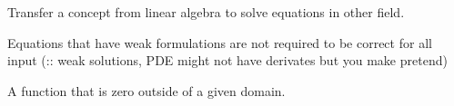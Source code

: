 \begin{definition}
    Transfer a concept from linear algebra to solve equations in other field.

    Equations that have weak formulations are not required to be correct for
    all input (:: weak solutions, PDE might not have derivates but you make pretend)

\end{definition}

\begin{definition}
    A function that is zero outside of a given domain.
\end{definition}
